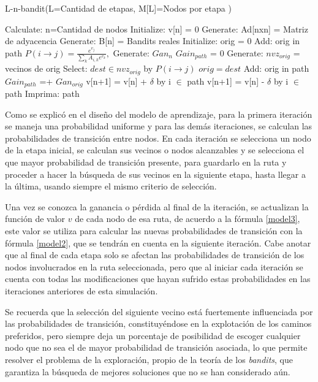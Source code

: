 \begin{algorithm} [h]
\caption{L-n-bandit(L=Cantidad de etapas, M[L]=Nodos por etapa )
} 
\label{Pseudo}
\begin{algorithmic}[1]
\STATE Calculate: n=Cantidad de nodos
\STATE Initialize: v[n] = 0
\STATE Generate: Ad[nxn] = Matriz de adyacencia
\STATE Generate: B[n] = Bandits reales
     \STATE Initialize: orig = 0
     \STATE Add: orig in path
     \STATE $P(i \to j) = \frac{e^{v_j}}{\sum_k A_{i,k} e^{v_k}},$
     \STATE Generate: $Gan_{n}$
     \STATE $Gain_{path}$ = 0
        \STATE Generate: $nvz_{orig}$ = vecinos de orig
        \STATE Select: $dest \in nvz_{orig}$  by $P(i \to j)$
        \STATE $orig = dest$
        \STATE Add: orig in path
        \STATE $Gain_{path}$ =+ $Gan_{orig}$
     \ENDFOR
        \STATE v[n+1] = v[n] + $\delta$ by i $\in$ path
     \ELSE
        \STATE v[n+1] = v[n] - $\delta$ by i $\in$ path   
     \ENDIF   
     \STATE Imprima: path
\ENDFOR
\end{algorithmic}
\end{algorithm}

Como se explicó en el diseño del modelo de aprendizaje, para la primera iteración se maneja una probabilidad uniforme y para las demás iteraciones, se calculan las probabilidades de transición entre nodos. En cada iteración se selecciona un nodo de la etapa inicial, se calculan sus vecinos o nodos alcanzables y se selecciona el que mayor probabilidad de transición presente, para guardarlo en la ruta y proceder a hacer la búsqueda de sus vecinos en la siguiente etapa, hasta llegar a la última, usando siempre el mismo criterio de selección.

Una vez se conozca la ganancia o pérdida al final de la iteración, se actualizan la función de valor $v$ de cada nodo de esa ruta, de acuerdo a la fórmula \ref{model3}, este valor se utiliza para calcular las nuevas probabilidades de transición con la fórmula \ref{model2}, que se tendrán en cuenta en la siguiente iteración. Cabe anotar que al final de cada etapa solo se afectan las probabilidades de transición de los nodos involucrados en la ruta seleccionada, pero que al iniciar cada iteración se cuenta con todas las modificaciones que hayan sufrido estas probabilidades en las iteraciones anteriores de esta simulación.

Se recuerda que la selección del siguiente vecino está fuertemente influenciada por las probabilidades de transición, constituyéndose en la explotación de los caminos preferidos, pero siempre deja un porcentaje de posibilidad de escoger cualquier nodo que no sea el de mayor probabilidad de transición asociada, lo que permite resolver el problema de la exploración, propio de la teoría de los \textit{bandits}, que garantiza la búsqueda de mejores soluciones que no se han considerado aún.

